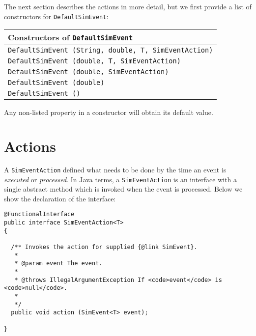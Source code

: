 The next section describes the actions in more detail, but we first provide a list
  of constructors for \lstinline{DefaultSimEvent}:

\begin{tabular}{|l|}
  \hline
  {\bf Constructors of \lstinline|DefaultSimEvent|} \\
  \hline
  \lstinline[basicstyle=\footnotesize]!DefaultSimEvent (String, double, T, SimEventAction)! \\
  \lstinline[basicstyle=\footnotesize]!DefaultSimEvent (double, T, SimEventAction)! \\
  \lstinline[basicstyle=\footnotesize]!DefaultSimEvent (double, SimEventAction)! \\
  \lstinline[basicstyle=\footnotesize]!DefaultSimEvent (double)! \\
  \lstinline[basicstyle=\footnotesize]!DefaultSimEvent ()! \\
  \hline
\end{tabular}

Any non-listed property in a constructor will obtain its default value.

\section{Actions}

A \lstinline{SimEventAction} defined what needs to be done by the time an event
  is {\em executed\/} or {\em processed}.
In Java terms, a \lstinline{SimEventAction} is an interface with
  a single abstract method which is invoked when the event is processed.
Below we show the declaration of the interface:
\begin{lstlisting}[basicstyle=\tiny]
@FunctionalInterface
public interface SimEventAction<T>
{

  /** Invokes the action for supplied {@link SimEvent}.
   *
   * @param event The event.
   *
   * @throws IllegalArgumentException If <code>event</code> is <code>null</code>.
   * 
   */
  public void action (SimEvent<T> event);

}
\end{lstlisting}

